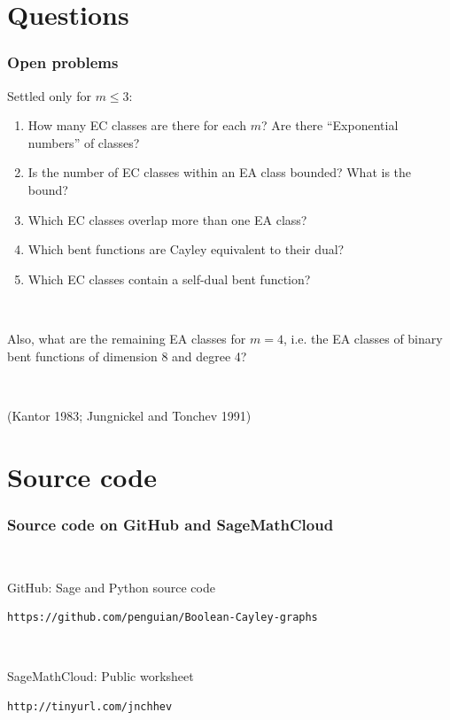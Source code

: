 \documentclass[pdf,sprung,slideColor,nocolorBG]{beamer}
\newcommand{\slidecite}[1]{\tiny{(#1)}\normalsize{}}
\begin{document}
\section{Questions}
\begin{frame}
\frametitle{Open problems}
Settled only for $m \leqslant 3$:
\begin{enumerate}
\item
How many EC classes are there for each $m$? 
Are there ``Exponential numbers'' of classes? 
\item
Is the number of EC classes within an EA class bounded? 
What is the bound?
\item
Which EC classes overlap more than one EA class?
\item
Which bent functions are Cayley equivalent to their dual?
\item
Which EC classes contain a self-dual bent function?
\end{enumerate}
~

Also, what are the remaining EA classes for $m=4$, 
i.e. the EA classes of binary bent functions of dimension 8 and degree 4?

~

\slidecite{Kantor 1983; Jungnickel and Tonchev 1991}
\end{frame}
\section{Source code}
\begin{frame}[fragile]
\frametitle{Source code on GitHub and SageMathCloud}
~

GitHub: Sage and Python source code

\begin{verbatim}
https://github.com/penguian/Boolean-Cayley-graphs
\end{verbatim}

~

SageMathCloud: Public worksheet

\begin{verbatim}
http://tinyurl.com/jnchhev
\end{verbatim}
 
\end{frame}
\end{document}
